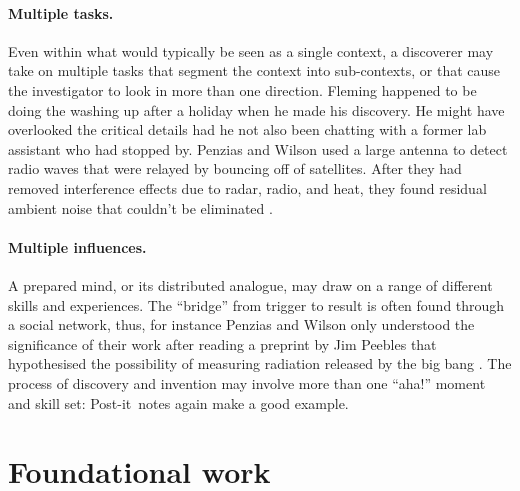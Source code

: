 \documentclass{llncs}
\begin{document}
\paragraph{Multiple tasks.}

Even within what would typically be seen as a single context, a
discoverer may take on multiple tasks that segment the context into
sub-contexts, or that cause the investigator to look in more than one
direction.
%
Fleming happened to be doing the washing up after a holiday when he
made his discovery.  He might have overlooked the critical details had
he not also been chatting with a former lab assistant who had stopped
by.  Penzias and Wilson used a large antenna to detect radio waves
that were relayed by bouncing off of satellites.  After they had
removed interference effects due to radar, radio, and heat, they found
residual ambient noise that couldn't be eliminated
\cite{wiki:cosmic-radiation}.

\paragraph{Multiple influences.}

A prepared mind, or its distributed analogue, may draw on a range of
different skills and experiences.  The ``bridge'' from trigger to
result is often found through a social network, thus, for instance
Penzias and Wilson only understood the significance of their work
after reading a preprint by Jim Peebles that hypothesised the
possibility of measuring radiation released by the big bang
\cite{wiki:cosmic-radiation}.
%
The process of discovery and invention may involve more than one
``aha!'' moment and skill set: Post-it\texttrademark\ notes again make
a good example.


\section{Foundational work} \label{sec:foundations}

\end{document}
